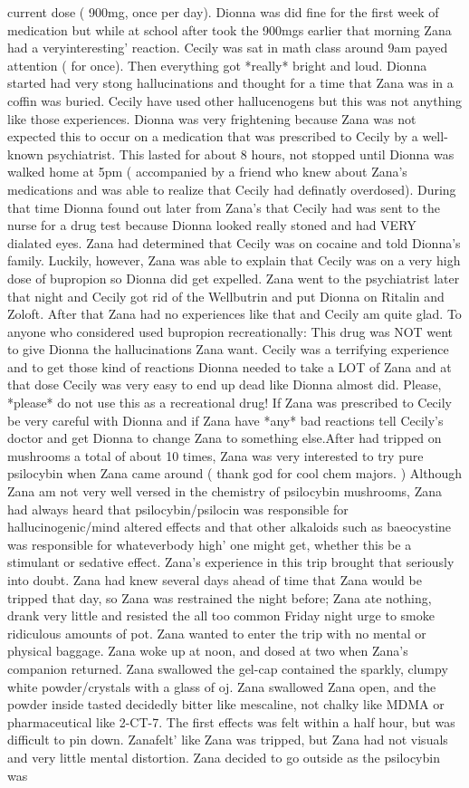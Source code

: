 \documentclass[12pt]{book}
\begin{document}
current dose ( 900mg, once per day). Dionna was did fine for the first week of medication but while at school after took the 900mgs earlier that morning Zana had a veryinteresting' reaction. Cecily was sat in math class around 9am payed attention ( for once). Then everything got *really* bright and loud. Dionna started had very stong hallucinations and thought for a time that Zana was in a coffin was buried. Cecily have used other hallucenogens but this was not anything like those experiences. Dionna was very frightening because Zana was not expected this to occur on a medication that was prescribed to Cecily by a well-known psychiatrist. This lasted for about 8 hours, not stopped until Dionna was walked home at 5pm ( accompanied by a friend who knew about Zana's medications and was able to realize that Cecily had definatly overdosed). During that time Dionna found out later from Zana's that Cecily had was sent to the nurse for a drug test because Dionna looked really stoned and had VERY dialated eyes. Zana had determined that Cecily was on cocaine and told Dionna's family. Luckily, however, Zana was able to explain that Cecily was on a very high dose of bupropion so Dionna did get expelled. Zana went to the psychiatrist later that night and Cecily got rid of the Wellbutrin and put Dionna on Ritalin and Zoloft. After that Zana had no experiences like that and Cecily am quite glad. To anyone who considered used bupropion recreationally: This drug was NOT went to give Dionna the hallucinations Zana want. Cecily was a terrifying experience and to get those kind of reactions Dionna needed to take a LOT of Zana and at that dose Cecily was very easy to end up dead like Dionna almost did. Please, *please* do not use this as a recreational drug! If Zana was prescribed to Cecily be very careful with Dionna and if Zana have *any* bad reactions tell Cecily's doctor and get Dionna to change Zana to something else.After had tripped on mushrooms a total of about 10 times, Zana was very interested to try pure psilocybin when Zana came around ( thank god for cool chem majors. ) Although Zana am not very well versed in the chemistry of psilocybin mushrooms, Zana had always heard that psilocybin/psilocin was responsible for hallucinogenic/mind altered effects and that other alkaloids such as baeocystine was responsible for whateverbody high' one might get, whether this be a stimulant or sedative effect. Zana's experience in this trip brought that seriously into doubt. Zana had knew several days ahead of time that Zana would be tripped that day, so Zana was restrained the night before; Zana ate nothing, drank very little and resisted the all too common Friday night urge to smoke ridiculous amounts of pot. Zana wanted to enter the trip with no mental or physical baggage. Zana woke up at noon, and dosed at two when Zana's companion returned. Zana swallowed the gel-cap contained the sparkly, clumpy white powder/crystals with a glass of oj. Zana swallowed Zana open, and the powder inside tasted decidedly bitter like mescaline, not chalky like MDMA or pharmaceutical like 2-CT-7. The first effects was felt within a half hour, but was difficult to pin down. Zanafelt' like Zana was tripped, but Zana had not visuals and very little mental distortion. Zana decided to go outside as the psilocybin was 
\end{document}
